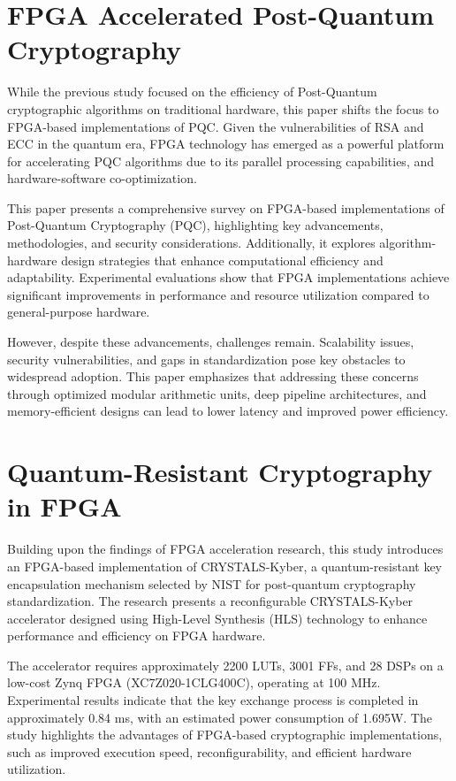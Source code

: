 \section{ FPGA Accelerated Post-Quantum Cryptography \cite{paper_2}}
While the previous study focused on the efficiency of Post-Quantum cryptographic algorithms on traditional hardware, this paper shifts the focus to FPGA-based implementations of PQC. Given the vulnerabilities of RSA and ECC in the quantum era, FPGA technology has emerged as a powerful platform for accelerating PQC algorithms due to its  parallel processing capabilities, and hardware-software co-optimization.

This paper presents a comprehensive survey on FPGA-based implementations of Post-Quantum Cryptography (PQC), highlighting key advancements, methodologies, and security considerations. Additionally, it explores algorithm-hardware design strategies that enhance computational efficiency and adaptability. Experimental evaluations show that FPGA implementations achieve significant improvements in performance and resource utilization compared to general-purpose hardware.

However, despite these advancements, challenges remain. Scalability issues, security vulnerabilities, and gaps in standardization pose key obstacles to widespread adoption. This paper emphasizes that addressing these concerns through optimized modular arithmetic units, deep pipeline architectures, and memory-efficient designs can lead to lower latency and improved power efficiency.

\section{Quantum-Resistant Cryptography in FPGA \cite{paper_3}}

Building upon the findings of FPGA acceleration research, this study introduces an FPGA-based implementation of CRYSTALS-Kyber, a quantum-resistant key encapsulation mechanism selected by NIST for post-quantum cryptography standardization. The research presents a reconfigurable CRYSTALS-Kyber accelerator designed using High-Level Synthesis (HLS) technology to enhance performance and efficiency on FPGA hardware.

The accelerator requires approximately 2200 LUTs, 3001 FFs, and 28 DSPs on a low-cost Zynq FPGA (XC7Z020-1CLG400C), operating at 100 MHz. Experimental results indicate that the key exchange process is completed in approximately 0.84 ms, with an estimated power consumption of 1.695W. The study highlights the advantages of FPGA-based cryptographic implementations, such as improved execution speed, reconfigurability, and efficient hardware utilization.

